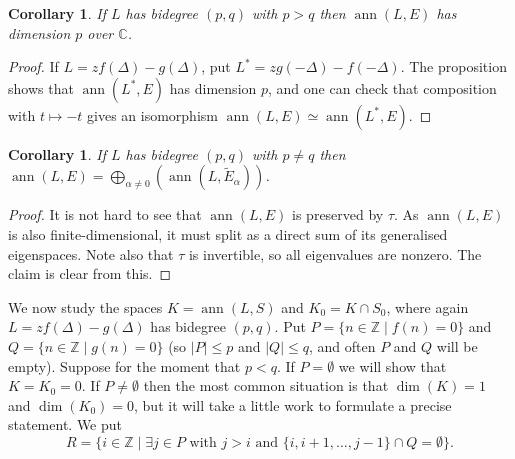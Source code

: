 \documentclass{amsart}
\newcommand{\ann}       {\operatorname{ann}}
\newcommand{\Z}         {{\mathbb{Z}}}
\newcommand{\C}         {{\mathbb{C}}}
\newcommand{\al}        {\alpha}
\newcommand{\Dl}        {\Delta}
\newcommand{\st}        {\;|\;}
\newcommand{\tE}	{\widetilde{E}}
\renewcommand{\:}{\colon}
\newtheorem{corollary}[theorem]{Corollary}
\theoremstyle{definition}
\begin{document}
\begin{corollary}
 If $L$ has bidegree $(p,q)$ with $p>q$ then $\ann(L,E)$ has dimension
 $p$ over $\C$.
\end{corollary}
\begin{proof}
 If $L=zf(\Dl)-g(\Dl)$, put $L^*=zg(-\Dl)-f(-\Dl)$.  The proposition
 shows that $\ann(L^*,E)$ has dimension $p$, and one can check that
 composition with $t\mapsto -t$ gives an isomorphism
 $\ann(L,E)\simeq\ann(L^*,E)$. 
\end{proof}

\begin{corollary}
 If $L$ has bidegree $(p,q)$ with $p\neq q$ then
 $\ann(L,E)=\bigoplus_{\al\neq 0}(\ann(L,\tE_\al))$. 
\end{corollary}
\begin{proof}
 It is not hard to see that $\ann(L,E)$ is preserved by $\tau$.  As
 $\ann(L,E)$ is also finite-dimensional, it must split as a direct sum
 of its generalised eigenspaces.  Note also that $\tau$ is invertible,
 so all eigenvalues are nonzero.  The claim is clear from this.
\end{proof}

We now study the spaces $K=\ann(L,S)$ and $K_0=K\cap S_0$, where again
$L=zf(\Dl)-g(\Dl)$ has bidegree $(p,q)$.  Put $P=\{n\in\Z\st f(n)=0\}$
and $Q=\{n\in\Z\st g(n)=0\}$ (so $|P|\leq p$ and $|Q|\leq q$, and
often $P$ and $Q$ will be empty).  Suppose for the moment that $p<q$.
If $P=\emptyset$ we will show that $K=K_0=0$.  If $P\neq\emptyset$
then the most common situation is that $\dim(K)=1$ and $\dim(K_0)=0$,
but it will take a little work to formulate a precise statement.  We
put 
\[ R = \{i\in\Z\st \exists j\in P \text{ with }
          j > i \text{ and } \{i,i+1,\dotsc,j-1\}\cap Q=\emptyset
   \}.
\]
\end{document}
